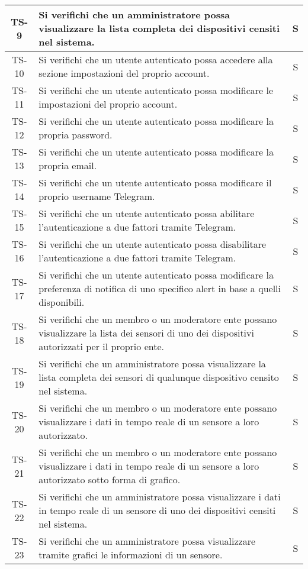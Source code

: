 \begin{center}
\begin{longtable}{|c|p{10cm}|c|}
			 \hline
			 TS-9 & Si verifichi che un amministratore possa visualizzare la lista completa dei dispositivi censiti nel sistema. & S \\
			 \hline
			 TS-10 & Si verifichi che un utente autenticato possa accedere alla sezione impostazioni del proprio account. & S \\
			 \hline
			 TS-11 & Si verifichi che un utente autenticato possa modificare le impostazioni del proprio account. & S \\
			 \hline
			 TS-12 & Si verifichi che un utente autenticato possa modificare la propria password. & S \\
			 \hline
			 TS-13 & Si verifichi che un utente autenticato possa modificare la propria email. & S \\
			 \hline
			 TS-14 & Si verifichi che un utente autenticato possa modificare il proprio username Telegram. & S \\
			 \hline
			 TS-15 & Si verifichi che un utente autenticato possa abilitare l'autenticazione a due fattori tramite Telegram. & S \\
			 \hline
			 TS-16 & Si verifichi che un utente autenticato possa disabilitare l'autenticazione a due fattori tramite Telegram. & S \\
			 \hline
			 TS-17 & Si verifichi che un utente autenticato possa modificare la preferenza di notifica di uno specifico alert in base a quelli disponibili. & S \\
			 \hline
			 TS-18 & Si verifichi che un membro o un moderatore ente possano visualizzare la lista dei sensori di uno dei dispositivi autorizzati per il proprio ente. & S \\
			 \hline
			 TS-19 & Si verifichi che un amministratore possa visualizzare la lista completa dei sensori di qualunque dispositivo censito nel sistema. & S \\
			 \hline
			 TS-20 & Si verifichi che un membro o un moderatore ente possano visualizzare i dati in tempo reale di un sensore a loro autorizzato. & S \\
			 \hline
			 TS-21 & Si verifichi che un membro o un moderatore ente possano visualizzare i dati in tempo reale di un sensore a loro autorizzato sotto forma di grafico. & S \\
			 \hline
			 TS-22 & Si verifichi che un amministratore possa visualizzare i dati in tempo reale di un sensore di uno dei dispositivi censiti nel sistema. & S \\
			 \hline
			 TS-23 & Si verifichi che un amministratore possa visualizzare tramite grafici le informazioni di un sensore. & S \\

\end{longtable}
\end{center}
